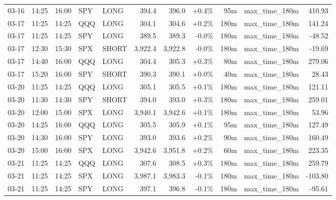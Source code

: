 \documentclass[11pt,a4paper,twoside]{article}
\begin{document}
\begin{center}
\begin{longtable}{>{\color{txtmain}}l l l l l r r r r >{\color{txtmain}}l r}
03-16 & 14:25 & 16:00 & SPY & LONG & 394.4 & 396.0 & \textcolor{wingreen}{+0.4\%} & 95m & max\_time\_180m & \textcolor{wingreen}{410.93} \\
03-17 & 11:25 & 14:25 & QQQ & LONG & 304.1 & 304.6 & \textcolor{wingreen}{+0.2\%} & 180m & max\_time\_180m & \textcolor{wingreen}{141.24} \\
03-17 & 11:25 & 14:25 & SPY & LONG & 389.5 & 389.3 & \textcolor{lossred}{-0.0\%} & 180m & max\_time\_180m & \textcolor{lossred}{-48.52} \\
03-17 & 12:30 & 15:30 & SPX & SHORT & 3,922.4 & 3,922.8 & \textcolor{lossred}{-0.0\%} & 180m & max\_time\_180m & \textcolor{lossred}{-19.69} \\
03-17 & 14:40 & 16:00 & QQQ & LONG & 304.4 & 305.3 & \textcolor{wingreen}{+0.3\%} & 80m & max\_time\_180m & \textcolor{wingreen}{279.06} \\
03-17 & 15:20 & 16:00 & SPY & SHORT & 390.3 & 390.1 & \textcolor{wingreen}{+0.0\%} & 40m & max\_time\_180m & \textcolor{wingreen}{28.43} \\
03-20 & 11:25 & 14:25 & QQQ & LONG & 305.1 & 305.5 & \textcolor{wingreen}{+0.1\%} & 180m & max\_time\_180m & \textcolor{wingreen}{121.11} \\
03-20 & 11:30 & 14:30 & SPY & SHORT & 394.0 & 393.0 & \textcolor{wingreen}{+0.3\%} & 180m & max\_time\_180m & \textcolor{wingreen}{259.01} \\
03-20 & 12:00 & 15:00 & SPX & LONG & 3,940.1 & 3,942.6 & \textcolor{wingreen}{+0.1\%} & 180m & max\_time\_180m & \textcolor{wingreen}{53.96} \\
03-20 & 14:25 & 16:00 & QQQ & LONG & 305.5 & 305.9 & \textcolor{wingreen}{+0.1\%} & 95m & max\_time\_180m & \textcolor{wingreen}{127.49} \\
03-20 & 14:30 & 16:00 & SPY & LONG & 393.0 & 393.6 & \textcolor{wingreen}{+0.2\%} & 90m & max\_time\_180m & \textcolor{wingreen}{160.49} \\
03-20 & 15:00 & 16:00 & SPX & LONG & 3,942.6 & 3,951.8 & \textcolor{wingreen}{+0.2\%} & 60m & max\_time\_180m & \textcolor{wingreen}{223.35} \\
03-21 & 11:25 & 14:25 & QQQ & LONG & 307.6 & 308.5 & \textcolor{wingreen}{+0.3\%} & 180m & max\_time\_180m & \textcolor{wingreen}{259.79} \\
03-21 & 11:25 & 14:25 & SPX & LONG & 3,987.1 & 3,983.3 & \textcolor{lossred}{-0.1\%} & 180m & max\_time\_180m & \textcolor{lossred}{-103.80} \\
03-21 & 11:25 & 14:25 & SPY & LONG & 397.1 & 396.8 & \textcolor{lossred}{-0.1\%} & 180m & max\_time\_180m & \textcolor{lossred}{-95.61} \\

\end{longtable}
\end{center}
\end{document}
